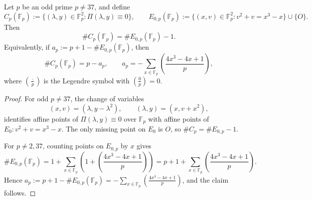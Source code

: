 \begin{proposition}\label{prop:cn-finite-field}
Let \(p\) be an odd prime \(p\neq 37\), and define
\[
C_p(\mathbb F_p):=\{(\lambda,y)\in\mathbb F_p^2:\Pi(\lambda,y)\equiv 0\},
\qquad
E_{0,p}(\mathbb F_p):=\{(x,v)\in\mathbb F_p^2:v^2+v=x^3-x\}\cup\{O\}.
\]
Then
\[
\#C_p(\mathbb F_p)=\#E_{0,p}(\mathbb F_p)-1.
\]
Equivalently, if \(a_p:=p+1-\#E_{0,p}(\mathbb F_p)\), then
\[
\#C_p(\mathbb F_p)=p-a_p,\qquad
a_p=-\sum_{x\in\mathbb F_p}\left(\frac{4x^3-4x+1}{p}\right),
\]
where \(\left(\frac{\cdot}{p}\right)\) is the Legendre symbol with \(\left(\frac{0}{p}\right)=0\).
\end{proposition}

\begin{proof}
For odd \(p\neq37\), the change of variables
\[
(x,v)=(\lambda,y-\lambda^2),\qquad (\lambda,y)=(x,v+x^2),
\]
identifies affine points of \(\Pi(\lambda,y)\equiv 0\) over \(\mathbb F_p\) with affine points of \(E_0: v^2+v=x^3-x\). The only missing point on \(E_0\) is \(O\), so \(\#C_p=\#E_{0,p}-1\).

For \(p\neq 2,37\), counting points on \(E_{0,p}\) by \(x\) gives
\[
\#E_{0,p}(\mathbb F_p)=1+\sum_{x\in\mathbb F_p}\left(1+\left(\frac{4x^3-4x+1}{p}\right)\right)
=p+1+\sum_{x\in\mathbb F_p}\left(\frac{4x^3-4x+1}{p}\right).
\]
Hence \(a_p:=p+1-\#E_{0,p}(\mathbb F_p)=-\sum_{x\in\mathbb F_p}\left(\frac{4x^3-4x+1}{p}\right)\), and the claim follows.
\end{proof}

